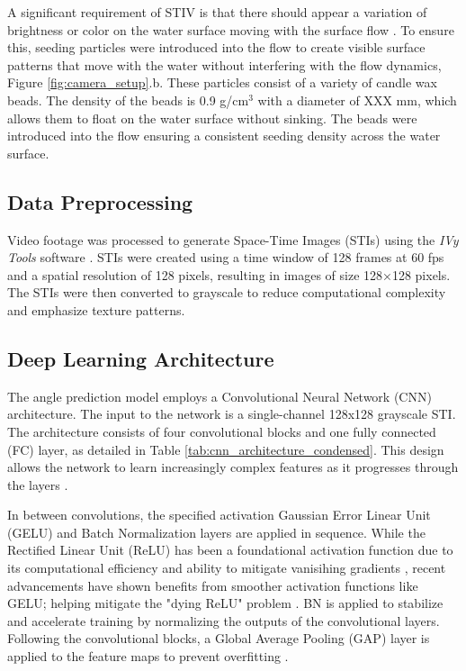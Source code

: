 \documentclass[12pt]{elsarticle}
\begin{document}
A significant requirement of STIV is that there should appear a variation of brightness or color on the water surface moving with the surface flow \cite{fujita2007development}. To ensure this, seeding particles were introduced into the flow to create visible surface patterns that move with the water without interfering with the flow dynamics, Figure \ref{fig:camera_setup}.b. These particles consist of a variety of candle wax beads. The density of the beads is 0.9 g/cm$^3$ with a diameter of XXX mm, which allows them to float on the water surface without sinking. The beads were introduced into the flow ensuring a consistent seeding density across the water surface.
\subsection{Data Preprocessing}
Video footage was processed to generate Space-Time Images (STIs) using the \textit{IVy Tools} software \cite{engel2025ivytools}. STIs were created using a time window of 128 frames at 60 fps and a spatial resolution of 128 pixels, resulting in images of size 128×128 pixels. The STIs were then converted to grayscale to reduce computational complexity and emphasize texture patterns.
\subsection{Deep Learning Architecture}
The angle prediction model employs a Convolutional Neural Network (CNN) architecture. The input to the network is a single-channel 128x128 grayscale STI. The architecture consists of four convolutional blocks and one fully connected (FC) layer, as detailed in Table \ref{tab:cnn_architecture_condensed}. This design allows the network to learn increasingly complex features as it progresses through the layers \cite{zeiler2014visualizing}.

In between convolutions, the specified activation Gaussian Error Linear Unit (GELU) and Batch Normalization layers are applied in sequence. While the Rectified Linear Unit (ReLU) has been a foundational activation function due to its computational efficiency and ability to mitigate vanisihing gradients \cite{pmlr-v15-glorot11a}, recent advancements have shown benefits from smoother activation functions like GELU; helping mitigate the "dying ReLU" problem \cite{hendrycks2016GELU, lu2019dying}. BN is applied to stabilize and accelerate training \cite{ioffe2015batch} by normalizing the outputs of the convolutional layers. Following the convolutional blocks, a Global Average Pooling (GAP) layer is applied to the feature maps to prevent overfitting \cite{lin2013GAP, watanabe2021improving}. 
\end{document}

